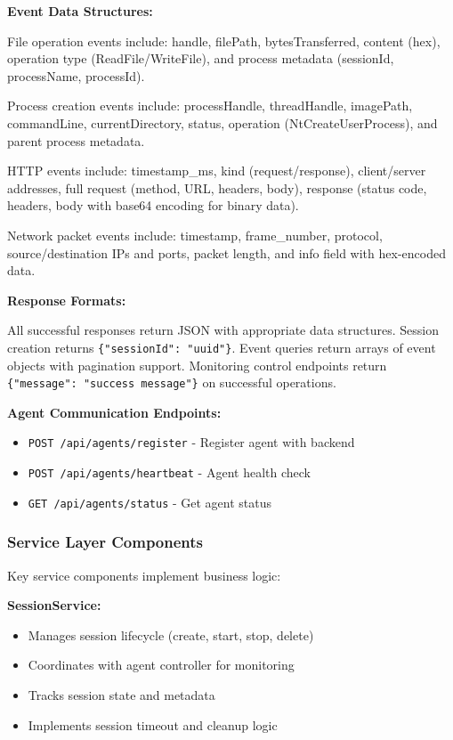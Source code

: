 \textbf{Event Data Structures:}

File operation events include: handle, filePath, bytesTransferred, content (hex), operation type (ReadFile/WriteFile), and process metadata (sessionId, processName, processId).

Process creation events include: processHandle, threadHandle, imagePath, commandLine, currentDirectory, status, operation (NtCreateUserProcess), and parent process metadata.

HTTP events include: timestamp\_ms, kind (request/response), client/server addresses, full request (method, URL, headers, body), response (status code, headers, body with base64 encoding for binary data).

Network packet events include: timestamp, frame\_number, protocol, source/destination IPs and ports, packet length, and info field with hex-encoded data.

\textbf{Response Formats:}

All successful responses return JSON with appropriate data structures. Session creation returns \texttt{\{"sessionId": "uuid"\}}. Event queries return arrays of event objects with pagination support. Monitoring control endpoints return \texttt{\{"message": "success message"\}} on successful operations.

\textbf{Agent Communication Endpoints:}
\begin{itemize}
    \item \texttt{POST /api/agents/register} - Register agent with backend
    \item \texttt{POST /api/agents/heartbeat} - Agent health check
    \item \texttt{GET /api/agents/status} - Get agent status
\end{itemize}

\subsubsection{Service Layer Components}

Key service components implement business logic:

\textbf{SessionService:}
\begin{itemize}
    \item Manages session lifecycle (create, start, stop, delete)
    \item Coordinates with agent controller for monitoring
    \item Tracks session state and metadata
    \item Implements session timeout and cleanup logic
\end{itemize}


